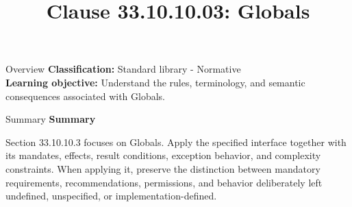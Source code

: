 \documentclass[10pt,letterpaper]{article}
\title{Clause 33.10.10.03: Globals}
\author{}
\date{}
\begin{document}
\maketitle
\begin{CornellOverviewBox}{Overview}
\textbf{Classification:} Standard library - Normative\\[2pt]
\textbf{Learning objective:} Understand the rules, terminology, and semantic consequences associated with Globals.
\end{CornellOverviewBox}\begin{CornellSummaryBox}{Summary}
{\sffamily\bfseries\color{Accent} Summary}\par\vspace{3pt}Section 33.10.10.3 focuses on Globals. Apply the specified interface together with its mandates, effects, result conditions, exception behavior, and complexity constraints. When applying it, preserve the distinction between mandatory requirements, recommendations, permissions, and behavior deliberately left undefined, unspecified, or implementation-defined.
\end{CornellSummaryBox}
\end{document}
